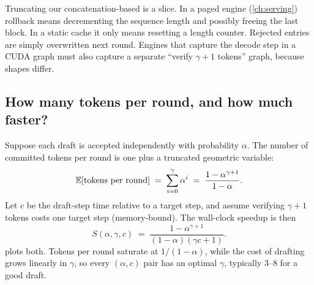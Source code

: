 \begin{pitfall}
Truncating our concatenation-based  is a slice. In a paged engine
(\cref{ch:serving}) rollback means decrementing the sequence length and possibly freeing
the last block. In a static cache it only means resetting a length counter. Rejected
entries are simply overwritten next round. Engines that capture the decode step in a CUDA
graph must also capture a separate ``verify $\gamma+1$ tokens'' graph, because shapes
differ.
\end{pitfall}

\subsection{How many tokens per round, and how much faster?}
Suppose each draft is accepted independently with probability $\alpha$. The number of
committed tokens per round is one plus a truncated geometric variable:
\begin{equation}
  \mathbb{E}[\text{tokens per round}] \;=\; \sum_{i=0}^{\gamma}\alpha^i \;=\;
  \frac{1-\alpha^{\gamma+1}}{1-\alpha}.
  \label{eq:efficient:tpr}
\end{equation}
Let $c$ be the draft-step time relative to a target step, and assume verifying $\gamma+1$
tokens costs one target step (memory-bound). The wall-clock speedup is then
\begin{equation}
  S(\alpha,\gamma,c) \;=\; \frac{1-\alpha^{\gamma+1}}{(1-\alpha)(\gamma c + 1)} .
  \label{eq:efficient:speedup}
\end{equation}
 plots both. Tokens per round saturate at
$1/(1-\alpha)$, while the cost of drafting grows linearly in $\gamma$, so every
$(\alpha,c)$ pair has an optimal $\gamma$, typically 3--8 for a good draft.

